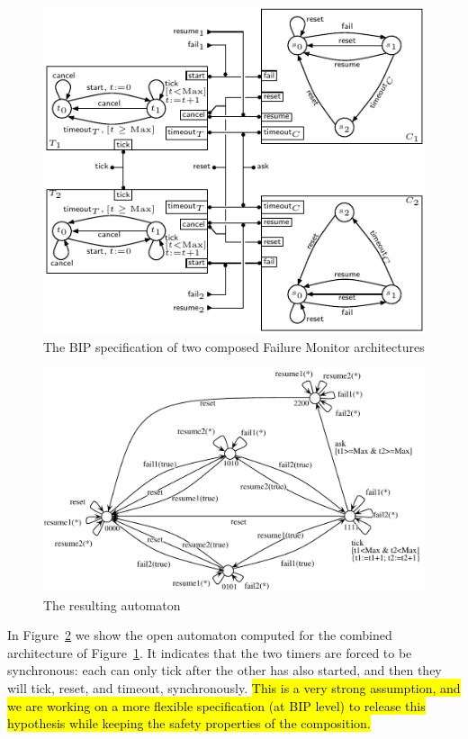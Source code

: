 \documentclass[smallcondensed]{svjour3}
\begin{document}
\begin{figure}[ht]
  \centering
  \includegraphics[width=0.9\columnwidth]{ActaXFIG/BIPspec-DoubleArchFailureTimer-v2-2}
  \caption{The BIP specification of two composed Failure Monitor architectures}
  \label{schema:ArchFailure:BIP:Double}
\end{figure}

\begin{figure}[ht]
  \centering
  \includegraphics[width=0.9\columnwidth]{ActaXFIG/Double-OA}
  \caption{The resulting automaton}
  \label{schema:ArchFailure:Double:OA}
\end{figure}

In Figure~\ref{schema:ArchFailure:Double:OA} we show the open
automaton computed for the combined architecture of
Figure~\ref{schema:ArchFailure:BIP:Double}.  It indicates that the two
timers are forced to be synchronous: each can only tick after the
other has also started, and then they will tick, reset, and timeout,
synchronously.
%
\hl{This is a very strong assumption, and we are working on a more
flexible specification (at BIP level) to release this hypothesis while
keeping the safety properties of the composition.}
\end{document}
